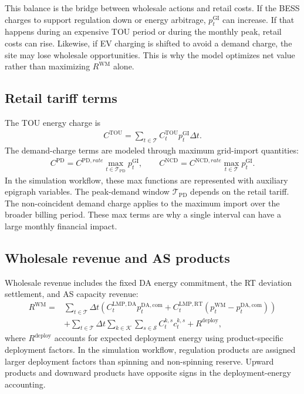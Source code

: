 \documentclass[final,5p,times]{elsarticle}
\newcommand{\DeltaT}{\Delta t}
\newcommand{\DA}{\mathrm{DA}}
\newcommand{\RT}{\mathrm{RT}}
\newcommand{\GI}{\mathrm{GI}}
\newcommand{\TOU}{\mathrm{TOU}}
\newcommand{\PD}{\mathrm{PD}}
\newcommand{\NCD}{\mathrm{NCD}}
\newcommand{\WM}{\mathrm{WM}}
\newcommand{\calT}{\mathcal{T}}
\newcommand{\calK}{\mathcal{K}}
\newcommand{\calS}{\mathcal{S}}
\begin{document}
This balance is the bridge between wholesale actions and retail costs. If the BESS charges to support regulation down or energy arbitrage, $p_t^{\GI}$ can increase. If that happens during an expensive TOU period or during the monthly peak, retail costs can rise. Likewise, if EV charging is shifted to avoid a demand charge, the site may lose wholesale opportunities. This is why the model optimizes net value rather than maximizing $R^{\WM}$ alone.

\subsection{Retail tariff terms}
The TOU energy charge is
\begin{align}
C^{\TOU}=\sum_{t\in\calT} C_t^{\TOU}p_t^{\GI}\DeltaT.
\label{eq:tou_main}
\end{align}
The demand-charge terms are modeled through maximum grid-import quantities:
\begin{align}
C^{\PD}=C^{\PD,rate}\max_{t\in\calT_{\PD}} p_t^{\GI},\qquad
C^{\NCD}=C^{\NCD,rate}\max_{t\in\calT}p_t^{\GI}.
\label{eq:demand_charge_main}
\end{align}
In the simulation workflow, these max functions are represented with auxiliary epigraph variables. The peak-demand window $\calT_{\PD}$ depends on the retail tariff. The non-coincident demand charge applies to the maximum import over the broader billing period. These max terms are why a single interval can have a large monthly financial impact.

\subsection{Wholesale revenue and AS products}
Wholesale revenue includes the fixed DA energy commitment, the RT deviation settlement, and AS capacity revenue:
\begin{align}
R^{\WM}=&\sum_{t\in\calT}\DeltaT\left(C_t^{\mathrm{LMP},\DA}p_t^{\DA,\mathrm{com}}+C_t^{\mathrm{LMP},\RT}\left(p_t^{\WM}-p_t^{\DA,\mathrm{com}}\right)\right)\nonumber\\
&+\sum_{t\in\calT}\DeltaT\sum_{k\in\calK}\sum_{s\in\calS} C_t^{k,s}c_t^{k,s} + R^{\mathrm{deploy}},
\label{eq:wm_revenue_main}
\end{align}
where $R^{\mathrm{deploy}}$ accounts for expected deployment energy using product-specific deployment factors. In the simulation workflow, regulation products are assigned larger deployment factors than spinning and non-spinning reserve. Upward products and downward products have opposite signs in the deployment-energy accounting.
\end{document}
